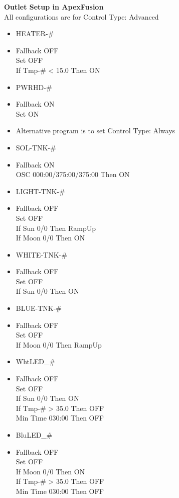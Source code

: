 \documentclass[]{book}
\providecommand{\tightlist}{%
  \setlength{\itemsep}{0pt}\setlength{\parskip}{0pt}}
\begin{document}
 \textbf{Outlet Setup in ApexFusion}\\
All configurations are for Control Type: Advanced

\begin{itemize}
\tightlist
\item
  HEATER-\#
\item
  Fallback OFF\\
  Set OFF\\
  If Tmp-\# \textless{} 15.0 Then ON\\
\item
  PWRHD-\#
\item
  Fallback ON\\
  Set ON\\
\item
  Alternative program is to set Control Type: Always\\
\item
  SOL-TNK-\#
\item
  Fallback ON\\
  OSC 000:00/375:00/375:00 Then ON\\
\item
  LIGHT-TNK-\#
\item
  Fallback OFF\\
  Set OFF\\
  If Sun 0/0 Then RampUp\\
  If Moon 0/0 Then ON\\
\item
  WHITE-TNK-\#
\item
  Fallback OFF\\
  Set OFF\\
  If Sun 0/0 Then ON\\
\item
  BLUE-TNK-\#
\item
  Fallback OFF\\
  Set OFF\\
  If Moon 0/0 Then RampUp\\
\item
  WhtLED\_\#
\item
  Fallback OFF\\
  Set OFF\\
  If Sun 0/0 Then ON\\
  If Tmp-\# \textgreater{} 35.0 Then OFF\\
  Min Time 030:00 Then OFF
\item
  BluLED\_\#
\item
  Fallback OFF\\
  Set OFF\\
  If Moon 0/0 Then ON\\
  If Tmp-\# \textgreater{} 35.0 Then OFF\\
  Min Time 030:00 Then OFF
\end{itemize}
\end{document}
